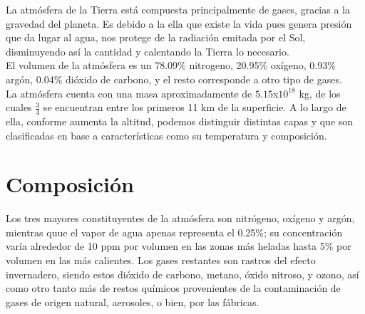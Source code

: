 \begin{titlepage}


{\large \date[10 de febrero, 2018 \\Hermosillo, Sonora}\\[1cm] %


\texttt{[image: Logo]}\\[1cm] %
 

\vfill %

\end{titlepage}



\noindent La atmósfera de la Tierra está compuesta principalmente
de gases, gracias a la gravedad del planeta. Es debido a la ella
que existe la vida pues genera presión que da lugar al agua, nos
protege de la radiación emitada por el Sol, disminuyendo así la
cantidad y calentando la Tierra lo necesario.
\\[3mm] El volumen de la atmósfera es un 78.09\% nitrogeno, 20.95\%
oxígeno, 0.93\% argón, 0.04\% dióxido de carbono, y el resto
corresponde a otro tipo de gases.
\\[3mm] La atmósfera cuenta con una masa aproximadamente de
$5.15$x$10^{18}$ kg, de los cuales $\frac{3}{4}$ se encuentran
entre los primeros 11 km de la superficie. A lo largo de ella,
conforme aumenta la altitud, podemos distinguir distintas capas
y que son clasificadas en base a características como su
temperatura y composición. 

\section{Composición}
Los tres mayores constituyentes de la atmósfera son nitrógeno,
oxígeno y argón, mientras quue el vapor de agua apenas representa
el 0.25\%; su concentración varía alrededor de 10 ppm por volumen
en las zonas más heladas hasta 5\% por volumen en las más calientes.
Los gases restantes son rastros del efecto invernadero, siendo estos dióxido de carbono, metano, óxido nitroso, y ozono, así como otro
tanto más de restos químicos provenientes de la contaminación de
gases de origen natural, aerosoles, o bien, por las fábricas.

